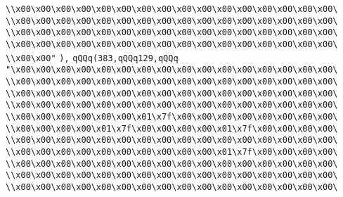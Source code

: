 \verb|\\x00\x00\x00\x00\x00\x00\x00\x00\x00\x00\x00\x00\x00\x00\x00\x00\|\newline
\verb|\\x00\x00\x00\x00\x00\x00\x00\x00\x00\x00\x00\x00\x00\x00\x00\x00\|\newline
\verb|\\x00\x00\x00\x00\x00\x00\x00\x00\x00\x00\x00\x00\x00\x00\x00\x00\|\newline
\verb|\\x00\x00\x00\x00\x00\x00\x00\x00\x00\x00\x00\x00\x00\x00\x00\x00\|\newline
\verb|\\x00\x00"|\newline
\verb|),|\newline
\verb|qQQq(383,qQQq129,qQQq|\newline
\verb|"\x00\x00\x00\x00\x00\x00\x00\x00\x00\x00\x00\x00\x00\x00\x00\x00\|\newline
\verb|\\x00\x00\x00\x00\x00\x00\x00\x00\x00\x00\x00\x00\x00\x00\x00\x00\|\newline
\verb|\\x00\x00\x00\x00\x00\x00\x00\x00\x00\x00\x00\x00\x00\x00\x00\x00\|\newline
\verb|\\x00\x00\x00\x00\x00\x00\x00\x00\x00\x00\x00\x00\x00\x00\x00\x00\|\newline
\verb|\\x00\x00\x00\x00\x00\x00\x01\x7f\x00\x00\x00\x00\x00\x00\x00\x00\|\newline
\verb|\\x00\x00\x00\x00\x01\x7f\x00\x00\x00\x00\x01\x7f\x00\x00\x00\x00\|\newline
\verb|\\x00\x00\x00\x00\x00\x00\x00\x00\x00\x00\x00\x00\x00\x00\x00\x00\|\newline
\verb|\\x00\x00\x00\x00\x00\x00\x00\x00\x00\x00\x01\x7f\x00\x00\x00\x00\|\newline
\verb|\\x00\x00\x00\x00\x00\x00\x00\x00\x00\x00\x00\x00\x00\x00\x00\x00\|\newline
\verb|\\x00\x00\x00\x00\x00\x00\x00\x00\x00\x00\x00\x00\x00\x00\x00\x00\|\newline
\verb|\\x00\x00\x00\x00\x00\x00\x00\x00\x00\x00\x00\x00\x00\x00\x00\x00\|\newline
